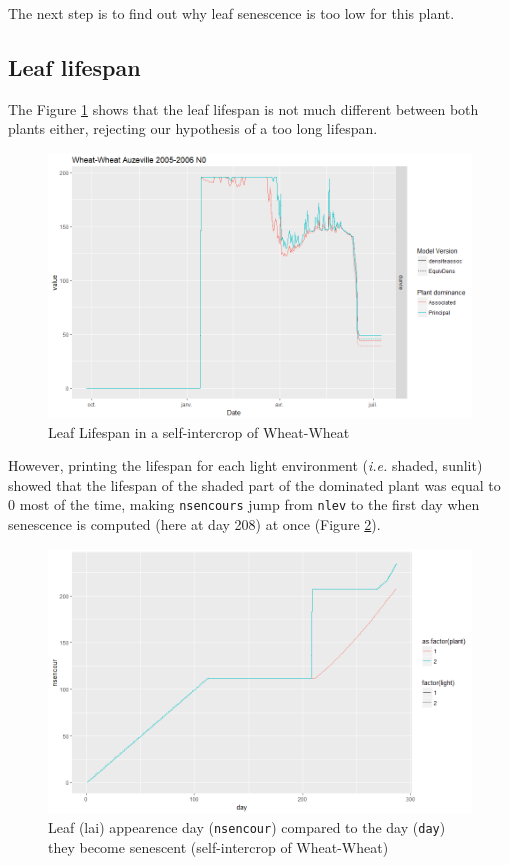 \documentclass[]{book}
\begin{document}
The next step is to find out why leaf senescence is too low for this plant.

\hypertarget{leaf-lifespan}{%
\subsection{Leaf lifespan}\label{leaf-lifespan}}

The Figure \ref{fig:Durvie} shows that the leaf lifespan is not much different between both plants either, rejecting our hypothesis of a too long lifespan.

\begin{figure}
\centering
\includegraphics{img/Durvie.png}
\caption{\label{fig:Durvie}Leaf Lifespan in a self-intercrop of Wheat-Wheat}
\end{figure}

However, printing the lifespan for each light environment (\emph{i.e.} shaded, sunlit) showed that the lifespan of the shaded part of the dominated plant was equal to 0 most of the time, making \texttt{nsencours} jump from \texttt{nlev} to the first day when senescence is computed (here at day 208) at once (Figure \ref{fig:nsencour}).

\begin{figure}
\centering
\includegraphics{img/LAIhigh_nsencour.png}
\caption{\label{fig:nsencour}Leaf (lai) appearence day (\texttt{nsencour}) compared to the day (\texttt{day}) they become senescent (self-intercrop of Wheat-Wheat)}
\end{figure}
\end{document}
